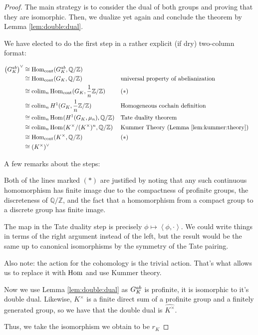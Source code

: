 \begin{proof}
	The main strategy is to consider the dual of both
	groups and proving that they are isomorphic.
	Then, we dualize yet again and conclude the theorem
	by Lemma \ref{lem:double:dual}.

	We have elected to do the first step in a rather 
	explicit (if dry) two-column format:

	\begin{align*}
		\left( G_{K}^{ab} \right)^{\vee} 
		&\cong \operatorname{Hom}_{\text{cont}} (G_{K}^{ab},\mathbb{Q} / \mathbb{Z}) \\
		&\cong \operatorname{Hom}_{\text{cont}} (G_{K}, \mathbb{Q} / \mathbb{Z})
		&& \text{universal property of abelianization} \\
		&\cong \operatorname{colim}_{n} \operatorname{Hom}_{\text{cont}} 
		(G_{K}, \frac{1}{n}\mathbb{Z} / \mathbb{Z})
		&& (*) \\
		&\cong \operatorname{colim}_{n} H^{1}(G_{K}, \frac{1}{n}\mathbb{Z} / \mathbb{Z})
		&& \text{Homogeneous cochain definition} \\
		&\cong \operatorname{colim}_{n} 
		\operatorname{Hom}_{} (H^{1}(G_{K},\mu_{n}),\mathbb{Q} / \mathbb{Z})
		&& \text{Tate duality theorem} \\
		&\cong \operatorname{colim}_{n} \operatorname{Hom}_{} (K^{\times} / (K^{\times})^{n},
		\mathbb{Q} / \mathbb{Z})
		&& \text{Kummer Theory (Lemma \ref{lem:kummer:theory})} \\
		&\cong \operatorname{Hom}_{\text{cont}} (K^{\times},\mathbb{Q} / \mathbb{Z})
		&& (*) \\
		&\cong (K^{\times})^{\vee}
	\end{align*}
	
	A few remarks about the steps:

	Both of the lines marked \((*)\) are justified by noting
	that any such continuous homomorphism has finite image
	due to the compactness of profinite groups, the discreteness
	of \(\mathbb{Q} / \mathbb{Z}\), and the fact that a
	homomorphism from a compact group to a discrete group has
	finite image.

	The map in the Tate duality step is precisely
	\(\phi \mapsto \left<\phi, \cdot \right>\).
	We could write things in terms of the right argument instead
	of the left, but the result would be the same up to 
	canonical isomorphisms by the symmetry of the Tate pairing.

	Also note: the action for the cohomology is the trivial action.
	That's what allows us to replace it with \(\operatorname{Hom}\) and use
	Kummer theory.
	
	Now we use Lemma \ref{lem:double:dual}
	as \(G_{K}^{ab}\) is profinite, it is isomorphic to it's double
	dual. Likewise, \(K^{\times}\) is a finite direct sum of
	a profinite group and a finitely generated group, so we have
	that the double dual is \(\hat{K^{\times}}\).
	
	Thus, we take the isomorphism we obtain to be \(r_{K}\)
\end{proof}

